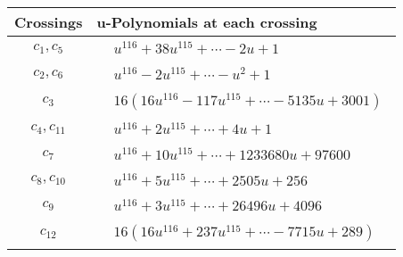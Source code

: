 \documentclass[1p]{elsarticle_modified}
\theoremstyle{definition}
\begin{document}
\begin{tabular}{m{50pt}|m{274pt}}
Crossings & \hspace{64pt}u-Polynomials at each crossing \\
\hline $$\begin{aligned}c_{1},c_{5}\end{aligned}$$&$\begin{aligned}
&u^{116}+38 u^{115}+\cdots-2 u+1
\end{aligned}$\\
\hline $$\begin{aligned}c_{2},c_{6}\end{aligned}$$&$\begin{aligned}
&u^{116}-2 u^{115}+\cdots- u^2+1
\end{aligned}$\\
\hline $$\begin{aligned}c_{3}\end{aligned}$$&$\begin{aligned}
&16(16 u^{116}-117 u^{115}+\cdots-5135 u+3001)
\end{aligned}$\\
\hline $$\begin{aligned}c_{4},c_{11}\end{aligned}$$&$\begin{aligned}
&u^{116}+2 u^{115}+\cdots+4 u+1
\end{aligned}$\\
\hline $$\begin{aligned}c_{7}\end{aligned}$$&$\begin{aligned}
&u^{116}+10 u^{115}+\cdots+1233680 u+97600
\end{aligned}$\\
\hline $$\begin{aligned}c_{8},c_{10}\end{aligned}$$&$\begin{aligned}
&u^{116}+5 u^{115}+\cdots+2505 u+256
\end{aligned}$\\
\hline $$\begin{aligned}c_{9}\end{aligned}$$&$\begin{aligned}
&u^{116}+3 u^{115}+\cdots+26496 u+4096
\end{aligned}$\\
\hline $$\begin{aligned}c_{12}\end{aligned}$$&$\begin{aligned}
&16(16 u^{116}+237 u^{115}+\cdots-7715 u+289)
\end{aligned}$\\
\hline
\end{tabular}\\~\\
\end{document}
